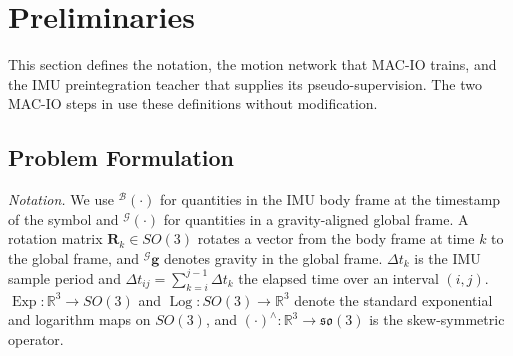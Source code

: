 \section{Preliminaries}
\label{sec:macio:prelims}

This section defines the notation, the motion network that MAC-IO trains, and the IMU preintegration teacher that supplies its pseudo-supervision.
The two MAC-IO steps in  use these definitions without modification.

\subsection{Problem Formulation}
\label{sec:macio:problem}

\textit{Notation.}
We use ${}^{\mathcal{B}}(\cdot)$ for quantities in the IMU body frame at the timestamp of the symbol and ${}^{\mathcal{G}}(\cdot)$ for quantities in a gravity-aligned global frame.
A rotation matrix $\mathbf{R}_k\in SO(3)$ rotates a vector from the body frame at time $k$ to the global frame, and ${}^{\mathcal{G}}\mathbf{g}$ denotes gravity in the global frame.
$\Delta t_k$ is the IMU sample period and $\Delta t_{ij}=\sum_{k=i}^{j-1}\Delta t_k$ the elapsed time over an interval $(i,j)$.
$\operatorname{Exp}\colon\mathbb{R}^{3}\to SO(3)$ and $\operatorname{Log}\colon SO(3)\to\mathbb{R}^{3}$ denote the standard exponential and logarithm maps on $SO(3)$, and $(\cdot)^{\wedge}\colon\mathbb{R}^{3}\to\mathfrak{so}(3)$ is the skew-symmetric operator.

